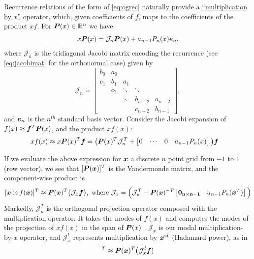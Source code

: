 Recurrence relations of the form of \eqref{eq:ogrec} naturally provide a \underline{``multiplication by $x$''} operator, which, given coefficients of $f$, maps to the coefficients of the product $xf$. For $\boldsymbol{P}(x) \in \mathbb{R}^n$ we have
\begin{equation}
x\boldsymbol{P}(x) = \mathcal{J}_n\boldsymbol{P}(x) + a_{n-1}P_n(x)\boldsymbol{e}_n,
\end{equation}
where $\mathcal{J}_n$ is the tridiagonal Jacobi matrix encoding the recurrence (see \eqref{eq:jacobimat} for the orthonormal case) given by
\begin{equation}\label{eq:jacobimatOG}
	\mathcal{J}_n = \begin{bmatrix}
		b_0 & a_0 & & &\\
		c_1 & b_1 & a_1 & & \\
		& c_2 & \ddots & \ddots & \\
		& & \ddots & b_{n-2} & a_{n-2}\\
		& & & c_{n-2} & b_{n-1}
	\end{bmatrix},
\end{equation}
and $\boldsymbol{e}_n$ is the $n^{th}$ standard basis vector. Consider the Jacobi expansion of $f(x) \approx \boldsymbol{f}^T \boldsymbol{P}(x)$, and the product $xf(x)$:
\begin{align}\label{eq:orthprojmult}
xf(x) &\approx x\boldsymbol{P}(x)^T\boldsymbol{f} = \big( \boldsymbol{P}(x)^T \mathcal{J}_n^T + \begin{bmatrix} 0 & \cdots & 0 & a_{n-1}P_n(x)\end{bmatrix}\big)\boldsymbol{f}
\end{align}

If we evaluate the above expression for $\boldsymbol{x}$ a discrete $n$ point grid from $-1$ to $1$ (row vector), we see that $[\boldsymbol{P}(\boldsymbol{x})]^T$ is the Vandermonde matrix, and the component-wise product is
\begin{equation}\label{eq:mbyx}
[\boldsymbol{x}\odot f(\boldsymbol{x})]^T \approx \boldsymbol{P}(\boldsymbol{x})^T\big(\mathcal{J}_x \boldsymbol{f}\big), \text{ where } \mathcal{J}_x = \Big(\mathcal{J}_n^T +  \boldsymbol{P}(\boldsymbol{x})^{-T}\begin{bmatrix} \bf{0}_{n\times n-1} & a_{n-1}P_n(\boldsymbol{x}^T)\end{bmatrix}\Big)
\end{equation}
Markedly, $\mathcal{J}_n^T$ is the \color{red} orthogonal projection operator composed with the multiplication operator. It takes the modes of $f(x)$ and computes the modes of the projection of $xf(x)$ in the span of $\boldsymbol{P}(x)$ \color{black}. $\mathcal{J}_x$ is our modal multiplication-by-$x$ operator, and $\mathcal{J}_x^l$ represents multiplication by $\boldsymbol{x}^{\circ l}$ (Hadamard power), as in 
\begin{equation}
[\bs{x}^{\circ l} \odot f(\bs{x})]^T \approx \bs{P}(\bs{x})^T\big(\mathcal{J}_x^l \bs{f})
\end{equation}

